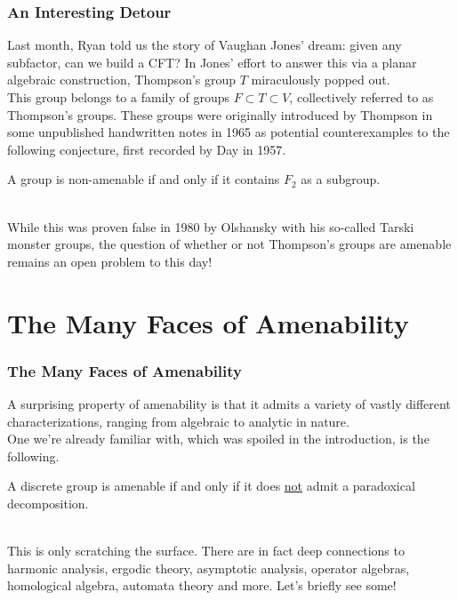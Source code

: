 \documentclass{beamer}
\begin{document}
\begin{frame}
\frametitle{An Interesting Detour}
Last month, Ryan told us the story of Vaughan Jones' dream: given any subfactor, can we build a CFT? In Jones' effort to answer this via a planar algebraic construction, Thompson's group $T$ miraculously popped out.\\[\baselineskip]

This group belongs to a family of groups $F \subset T \subset V$, collectively referred to as Thompson's groups. These groups were originally introduced by Thompson in some unpublished handwritten notes in 1965 as potential counterexamples to the following conjecture, first recorded by Day in 1957.\\[0.5\baselineskip]

\begin{example}
A group is non-amenable if and only if it contains $F_2$ as a subgroup.
\end{example}

\noindent\\[0.5\baselineskip] While this was proven false in 1980 by Olshansky with his so-called Tarski monster groups, the question of whether or not Thompson's groups are amenable remains an open problem to this day!
\end{frame}


\section{The Many Faces of Amenability}

\begin{frame}
\frametitle{The Many Faces of Amenability}
\noindent A surprising property of amenability is that it admits a variety of vastly different characterizations, ranging from algebraic to analytic in nature.\\[0.5\baselineskip]

\noindent One we're already familiar with, which was spoiled in the introduction, is the following.\\[0.5\baselineskip]

\begin{theorem}
A discrete group is amenable if and only if it does \underline{not} admit a paradoxical decomposition.
\end{theorem}

\noindent\\[0.5\baselineskip] This is only scratching the surface. There are in fact deep connections to harmonic analysis, ergodic theory, asymptotic analysis, operator algebras, homological algebra, automata theory and more. Let's briefly see some!
\end{frame}
\end{document}

